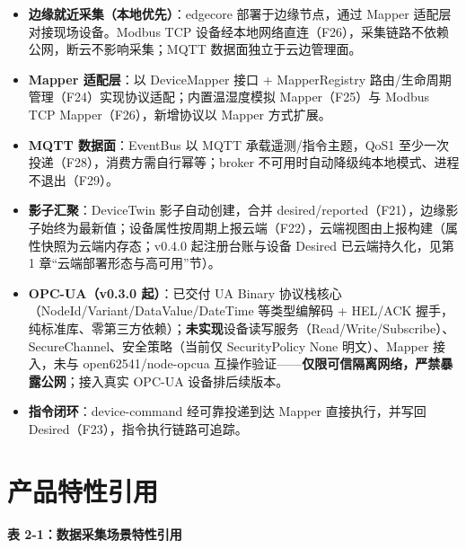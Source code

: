 \begin{itemize}
  \item \textbf{边缘就近采集（本地优先）}：edgecore 部署于边缘节点，通过 Mapper 适配层对接现场设备。Modbus TCP 设备经本地网络直连（F26），采集链路不依赖公网，断云不影响采集；MQTT 数据面独立于云边管理面。
  \item \textbf{Mapper 适配层}：以 DeviceMapper 接口 + MapperRegistry 路由/生命周期管理（F24）实现协议适配；内置温湿度模拟 Mapper（F25）与 Modbus TCP Mapper（F26），新增协议以 Mapper 方式扩展。
  \item \textbf{MQTT 数据面}：EventBus 以 MQTT 承载遥测/指令主题，QoS1 至少一次投递（F28），消费方需自行幂等；broker 不可用时自动降级纯本地模式、进程不退出（F29）。
  \item \textbf{影子汇聚}：DeviceTwin 影子自动创建，合并 desired/reported（F21），边缘影子始终为最新值；设备属性按周期上报云端（F22），云端视图由上报构建（属性快照为云端内存态；v0.4.0 起注册台账与设备 Desired 已云端持久化，见第 1 章“云端部署形态与高可用”节）。
  \item \textbf{OPC-UA（v0.3.0 起）}：已交付 UA Binary 协议栈核心（NodeId/Variant/DataValue/DateTime 等类型编解码 + HEL/ACK 握手，纯标准库、零第三方依赖）；\textbf{未实现}设备读写服务（Read/Write/Subscribe）、SecureChannel、安全策略（当前仅 SecurityPolicy None 明文）、Mapper 接入，未与 open62541/node-opcua 互操作验证——\textbf{仅限可信隔离网络，严禁暴露公网}；接入真实 OPC-UA 设备排后续版本。
  \item \textbf{指令闭环}：device-command 经可靠投递到达 Mapper 直接执行，并写回 Desired（F23），指令执行链路可追踪。
\end{itemize}

\section{产品特性引用}

\textbf{表 2-1：数据采集场景特性引用}

